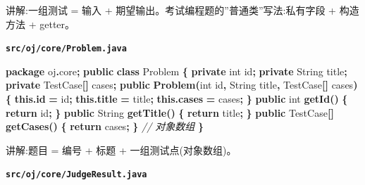 \documentclass[
  11pt,
]{ctexart}
\newenvironment{Shaded}{\begin{snugshade}}{\end{snugshade}}
\newcommand{\BuiltInTok}[1]{#1}
\newcommand{\CommentTok}[1]{\textcolor[rgb]{0.56,0.35,0.01}{\textit{#1}}}
\newcommand{\ControlFlowTok}[1]{\textcolor[rgb]{0.13,0.29,0.53}{\textbf{#1}}}
\newcommand{\DataTypeTok}[1]{\textcolor[rgb]{0.13,0.29,0.53}{#1}}
\newcommand{\FunctionTok}[1]{\textcolor[rgb]{0.13,0.29,0.53}{\textbf{#1}}}
\newcommand{\ImportTok}[1]{#1}
\newcommand{\KeywordTok}[1]{\textcolor[rgb]{0.13,0.29,0.53}{\textbf{#1}}}
\newcommand{\NormalTok}[1]{#1}
\newcommand{\OperatorTok}[1]{\textcolor[rgb]{0.81,0.36,0.00}{\textbf{#1}}}
\begin{document}
讲解:一组测试 = 输入 + 期望输出。考试编程题的''普通类''写法:私有字段 +
构造方法 + getter。

\textbf{\texttt{src/oj/core/Problem.java}}

\begin{Shaded}
\begin{Highlighting}[]
\KeywordTok{package}\ImportTok{ oj}\OperatorTok{.}\ImportTok{core}\OperatorTok{;}
\KeywordTok{public} \KeywordTok{class}\NormalTok{ Problem }\OperatorTok{\{}
    \KeywordTok{private} \DataTypeTok{int}\NormalTok{ id}\OperatorTok{;} \KeywordTok{private} \BuiltInTok{String}\NormalTok{ title}\OperatorTok{;} \KeywordTok{private}\NormalTok{ TestCase}\OperatorTok{[]}\NormalTok{ cases}\OperatorTok{;}
    \KeywordTok{public} \FunctionTok{Problem}\OperatorTok{(}\DataTypeTok{int}\NormalTok{ id}\OperatorTok{,} \BuiltInTok{String}\NormalTok{ title}\OperatorTok{,}\NormalTok{ TestCase}\OperatorTok{[]}\NormalTok{ cases}\OperatorTok{)} \OperatorTok{\{} \KeywordTok{this}\OperatorTok{.}\FunctionTok{id} \OperatorTok{=}\NormalTok{ id}\OperatorTok{;} \KeywordTok{this}\OperatorTok{.}\FunctionTok{title} \OperatorTok{=}\NormalTok{ title}\OperatorTok{;} \KeywordTok{this}\OperatorTok{.}\FunctionTok{cases} \OperatorTok{=}\NormalTok{ cases}\OperatorTok{;} \OperatorTok{\}}
    \KeywordTok{public} \DataTypeTok{int} \FunctionTok{getId}\OperatorTok{()}           \OperatorTok{\{} \ControlFlowTok{return}\NormalTok{ id}\OperatorTok{;} \OperatorTok{\}}
    \KeywordTok{public} \BuiltInTok{String} \FunctionTok{getTitle}\OperatorTok{()}     \OperatorTok{\{} \ControlFlowTok{return}\NormalTok{ title}\OperatorTok{;} \OperatorTok{\}}
    \KeywordTok{public}\NormalTok{ TestCase}\OperatorTok{[]} \FunctionTok{getCases}\OperatorTok{()} \OperatorTok{\{} \ControlFlowTok{return}\NormalTok{ cases}\OperatorTok{;} \OperatorTok{\}}   \CommentTok{// 对象数组}
\OperatorTok{\}}
\end{Highlighting}
\end{Shaded}

讲解:题目 = 编号 + 标题 + 一组测试点(对象数组)。

\textbf{\texttt{src/oj/core/JudgeResult.java}}
\end{document}
